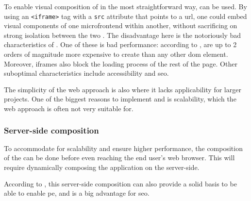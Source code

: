 To enable visual composition of  in the most
straightforward way, \textbf{} can be used. By using an
\texttt{<iframe>} tag with a \texttt{src} attribute that points to a \gls{url},
one could embed visual components of one \gls{microfrontend} within another,
without sacrificing on strong isolation between the two \autocite{Geers_2020}.
The disadvantage here is the notoriously bad characteristics of
. One of these is bad performance: according to
\textcite{Souders_2013},  are up to 2 orders of magnitude more
expensive to create than any other \gls{dom} element. Moreover, iframes also
block the loading process of the rest of the page. Other suboptimal
characteristics include accessibility and \gls{seo}.

The simplicity of the web approach is also where it lacks applicability for
larger projects. One of the biggest reasons to implement
 and  is scalability, which the
web approach is often not very suitable for.

\subsubsection{Server-side composition}

To accommodate for scalability and ensure higher performance, the composition of
the  can be done before even reaching the end user's
web browser. This will require dynamically composing the application on the
server-side.

According to \textcite{Geers_2020}, this server-side composition can also
provide a solid basis to be able to enable \gls{pe}, and is a big advantage for
\gls{seo}.


